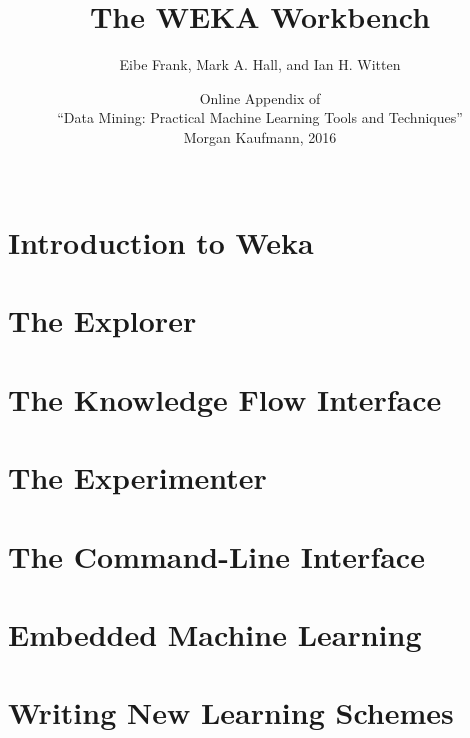 \documentclass[a4paper]{book}
\title{{\Huge The WEKA Workbench}}
\author{Eibe Frank, Mark A. Hall, and Ian H. Witten}
\date{Online Appendix of\\ ``Data Mining: Practical Machine Learning Tools and Techniques''\\Morgan Kaufmann, 2016\\ ~\vspace{1cm}\\\epsfig{file=images/Book4thEd.jpg,width=6cm}}
\begin{document}
\begin{titlepage}
\maketitle

\end{titlepage}

\tableofcontents

\chapter{Introduction to Weka}


\chapter{The Explorer}
\label{chapt:explorer}


\chapter{The Knowledge Flow Interface}
\label{chapt:knowledge_flow}


\chapter{The Experimenter}
\label{chapt:experimenter}


\chapter{The Command-Line Interface}
\label{chapt:command_line}


\chapter{Embedded Machine Learning}
\label{chapt:embedded}


\chapter{Writing New Learning Schemes}
\label{chapt:writing_learning_schemes}

\end{document}
